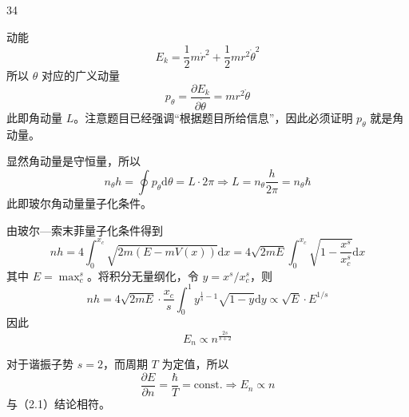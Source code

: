 \begin{solution}{34}
    \begin{subsolution}
        动能
        \begin{equation}
            E _ {k} = \frac {1}{2} m \dot {r} ^ {2} + \frac {1}{2} m r ^ {2} \dot {\theta} ^ {2}
            \label{eq:1.s34}
        \end{equation}
        所以 $\theta$ 对应的广义动量
        \begin{equation}
            p _ {\theta} = \frac {\partial E _ {k}}{\partial \dot {\theta}} = m r ^ {2} \dot {\theta}
            \label{eq:2.s34}
        \end{equation}
        此即角动量 $L$。注意题目已经强调“根据题目所给信息”，因此必须证明 $p_{\theta}$ 就是角动量。

        显然角动量是守恒量，所以
        \begin{equation}
            n _ {\theta} h = \oint p _ {\theta} \mathrm{d} \theta = L \cdot 2 \pi \Rightarrow L = n _ {\theta} \frac {h}{2 \pi} = n _ {\theta} \hbar
            \label{eq:3.s34}
        \end{equation}
        此即玻尔角动量量子化条件。
    \end{subsolution}
    \begin{subsolution}
        \begin{subsubsolution}
            由玻尔—索末菲量子化条件得到
            \begin{equation}
                n h = 4 \int_ {0} ^ {x _ {c}} \sqrt {2 m (E - m V (x))} \mathrm{d} x = 4 \sqrt {2 m E} \int_ {0} ^ {x _ {c}} \sqrt {1 - \frac {x ^ {s}}{x _ {c} ^ {s}}} \mathrm{d} x
                \label{eq:4.s34}
            \end{equation}
            其中 $E = \max_{c}^{s}$。将积分无量纲化，令 $y = x^{s} / x_{c}^{s}$，则
            \begin{equation}
                n h = 4 \sqrt {2 m E} \cdot \frac {x _ {c}}{s} \int_ {0} ^ {1} y ^ {\frac {1}{s} - 1} \sqrt {1 - y} \mathrm{d} y \propto \sqrt {E} \cdot E ^ {1 / s}
                \label{eq:5.s34}
            \end{equation}
            因此
            \begin{equation}
                E _ {n} \propto n ^ {\frac {2 s}{s + 2}}
                \label{eq:6.s34}
            \end{equation}
        \end{subsubsolution}
        \begin{subsubsolution}
            对于谐振子势 $s = 2$，而周期 $T$ 为定值，所以
            \begin{equation}
                \frac {\partial E}{\partial n} = \frac {\hbar}{T} = \mathrm{const.} \Rightarrow E _ {n} \propto n
                \label{eq:7.s34}
            \end{equation}
            与（2.1）结论相符。


\end{subsubsolution}
\end{subsolution}
\end{solution}
